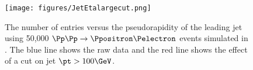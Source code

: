 \begin{figure}[htbp]
\centering
\texttt{[image: figures/JetEtalargecut.png]}
\caption{The number of entries versus the pseudorapidity of the leading jet using 50,000 $\Pp\Pp \rightarrow \Ppositron \Pelectron$ events simulated in \madgraph. The blue line shows the raw data and the red line shows the effect of a cut on jet $\pt > 100\GeV$.}
\end{figure}


